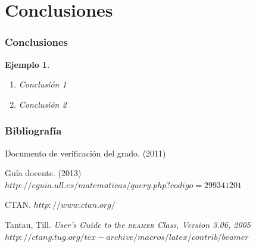 \documentclass{beamer}
\newcommand{\beamer}{\textsc{beamer}}
\newtheorem{ejemplo}{Ejemplo}
\begin{document}
\section{Conclusiones}

\begin{frame}
\frametitle{Conclusiones}

\begin{ejemplo}
  \begin{enumerate}
    \item
      Conclusión 1
      \pause
    \item
      Conclusión 2
  \end{enumerate}
\end{ejemplo}

\end{frame}

\begin{frame}
  \frametitle{Bibliografía}

  \begin{thebibliography}{10}

    \beamertemplatebookbibitems
    Documento de verificación del grado. 
    (2011) 

    \beamertemplatebookbibitems
    Guía docente. 
    (2013) 
    {\small $http://eguia.ull.es/matematicas/query.php?codigo=299341201$}

    \beamertemplatebookbibitems
    CTAN. {\small $http://www.ctan.org/$}

    \beamertemplatebookbibitems
    Tantau, Till. 
    \emph{User's Guide to the \beamer{} Class, Version 3.06, 2005} 
    {\small $http://ctang.tug.org/tex-archive/macros/latex/contrib/beamer$}


  \end{thebibliography}
\end{frame}


\end{document}
